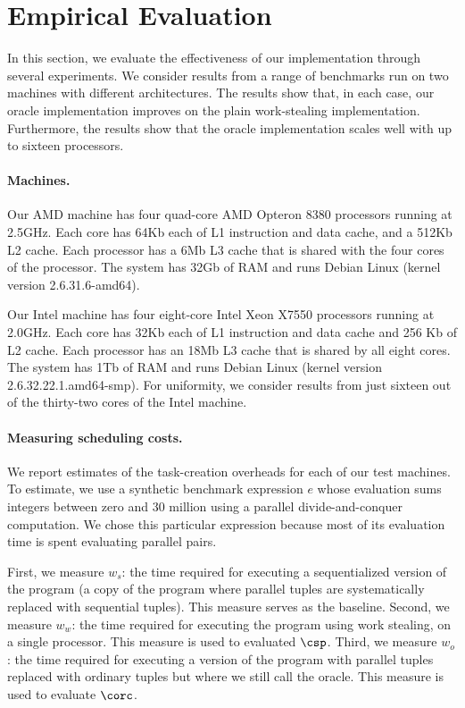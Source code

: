 \section{Empirical Evaluation}
\label{sec:exp}

In this section, we evaluate the effectiveness of our implementation
through several experiments. We consider results from a range of
benchmarks run on two machines with different architectures. The
results show that, in each case, our oracle implementation improves on
the plain work-stealing implementation. Furthermore, the results show
that the oracle implementation scales well with up to sixteen processors.

\paragraph{Machines.}

Our AMD machine has four quad-core AMD Opteron 8380 processors running
at 2.5GHz.  Each core has 64Kb each of L1 instruction and data cache,
and a 512Kb L2 cache. Each processor has a 6Mb L3 cache that is shared
with the four cores of the processor.  The system has 32Gb of RAM and
runs Debian Linux (kernel version 2.6.31.6-amd64).

Our Intel machine has four eight-core Intel Xeon X7550 processors
running at 2.0GHz. Each core has 32Kb each of L1 instruction and
data cache and 256 Kb of L2 cache. Each processor has an 18Mb L3 cache
that is shared by all eight cores. The system has 1Tb of RAM and runs
Debian Linux (kernel version 2.6.32.22.1.amd64-smp).
For uniformity, we consider results from just sixteen out of the
thirty-two cores of the Intel machine. 

\paragraph{Measuring scheduling costs.}

We report estimates of the task-creation overheads for each of our test
machines. To estimate, we use a synthetic benchmark expression $e$
whose evaluation sums integers between zero and 30 million using a
parallel divide-and-conquer computation. We chose this particular
expression because most of its evaluation time is spent evaluating
parallel pairs. 

First, we measure $w_s$: the time required for executing a
sequentialized version of the program (a copy of the program where
parallel tuples are systematically replaced with sequential tuples).
This measure serves as the baseline.  Second, we measure $w_w$: the
time required for executing the program using work stealing, on a
single processor.  This measure is used to evaluated $\csp$.  Third,
we measure $w_o$: the time required for executing a version of the
program with parallel tuples replaced with ordinary tuples but where
we still call the oracle. %
This measure is used to evaluate $\corc$.

